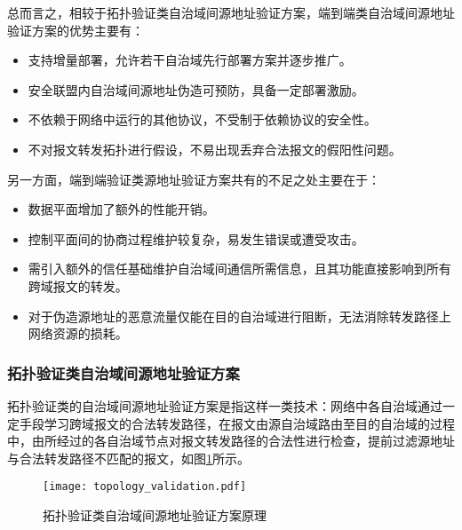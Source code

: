       总而言之，相较于拓扑验证类自治域间源地址验证方案，端到端类自治域间源地址验证方案的优势主要有：
      \begin{itemize}
        \item 支持增量部署，允许若干自治域先行部署方案并逐步推广。
        \item 安全联盟内自治域间源地址伪造可预防，具备一定部署激励。
        \item 不依赖于网络中运行的其他协议，不受制于依赖协议的安全性。
        \item 不对报文转发拓扑进行假设，不易出现丢弃合法报文的假阳性问题。
      \end{itemize}

      另一方面，端到端验证类源地址验证方案共有的不足之处主要在于：
      \begin{itemize}
        \item 数据平面增加了额外的性能开销。
        \item 控制平面间的协商过程维护较复杂，易发生错误或遭受攻击。
        \item 需引入额外的信任基础维护自治域间通信所需信息，且其功能直接影响到所有跨域报文的转发。
        \item 对于伪造源地址的恶意流量仅能在目的自治域进行阻断，无法消除转发路径上网络资源的损耗。
      \end{itemize}

      \subsubsection{拓扑验证类自治域间源地址验证方案}
      \label{survey:sava:interas:path}
      拓扑验证类的自治域间源地址验证方案是指这样一类技术：网络中各自治域通过一定手段学习跨域报文的合法转发路径，在报文由源自治域路由至目的自治域的过程中，由所经过的各自治域节点对报文转发路径的合法性进行检查，提前过滤源地址与合法转发路径不匹配的报文，如图\ref{fig:topology_validation}所示。

      \begin{figure}[ht]
        \centering
        \texttt{[image: topology\_validation.pdf]}
        \caption{拓扑验证类自治域间源地址验证方案原理}
        \label{fig:topology_validation}
      \end{figure}

